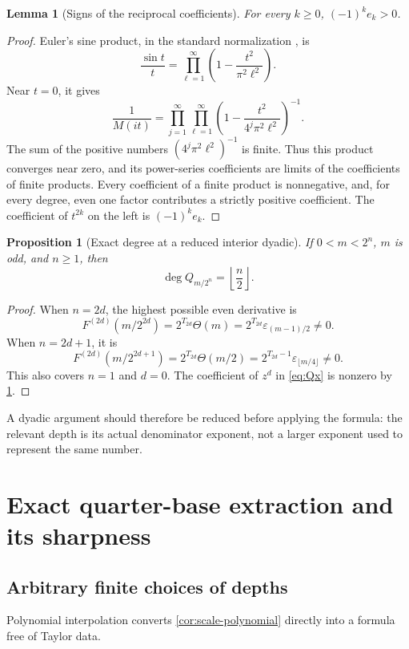 \documentclass[11pt,a4paper]{article}
\numberwithin{equation}{section}
\newtheorem{lemma}[theorem]{Lemma}
\newtheorem{proposition}[theorem]{Proposition}
\theoremstyle{definition}
\theoremstyle{remark}
\newcommand{\eps}{\varepsilon}
\newcommand{\floor}[1]{\left\lfloor #1\right\rfloor}
\begin{document}
\begin{lemma}[Signs of the reciprocal coefficients]
\label{lem:e-sign}
For every $k\ge0$, $(-1)^ke_k>0$.
\end{lemma}
\begin{proof}
Euler's sine product, in the standard normalization \cite[Eq.~4.22.1]{dlmf}, is
\[
 \frac{\sin t}{t}=\prod_{\ell=1}^{\infty}
    \left(1-\frac{t^2}{\pi^2\ell^2}\right).
\]
Near $t=0$, it gives
\begin{equation}
 \frac1{M(it)}=
 \prod_{j=1}^{\infty}\prod_{\ell=1}^{\infty}
 \left(1-\frac{t^2}{4^j\pi^2\ell^2}\right)^{-1}.
 \label{eq:e-positive-product}
\end{equation}
The sum of the positive numbers $(4^j\pi^2\ell^2)^{-1}$ is finite. Thus this product converges near zero, and its power-series coefficients are limits of the coefficients of finite products. Every coefficient of a finite product is nonnegative, and, for every degree, even one factor contributes a strictly positive coefficient. The coefficient of $t^{2k}$ on the left is $(-1)^ke_k$.
\end{proof}

\begin{proposition}[Exact degree at a reduced interior dyadic]
\label{prop:exact-degree}
If $0<m<2^n$, $m$ is odd, and $n\ge1$, then
\begin{equation}
 \deg Q_{m/2^n}=\floor{\frac n2}.
 \label{eq:exact-degree}
\end{equation}
\end{proposition}
\begin{proof}
When $n=2d$, the highest possible even derivative is
\[
 F^{(2d)}(m/2^{2d})=2^{T_{2d}}\Theta(m)
   =2^{T_{2d}}\eps_{(m-1)/2}\ne0.
\]
When $n=2d+1$, it is
\[
 F^{(2d)}(m/2^{2d+1})
 =2^{T_{2d}}\Theta(m/2)
 =2^{T_{2d}-1}\eps_{\lfloor m/4\rfloor}\ne0.
\]
This also covers $n=1$ and $d=0$. The coefficient of $z^d$ in \cref{eq:Qx} is nonzero by \cref{lem:e-sign}.
\end{proof}
A dyadic argument should therefore be reduced before applying the formula: the relevant depth is its actual denominator exponent, not a larger exponent used to represent the same number.

\section{Exact quarter-base extraction and its sharpness}
\label{sec:extraction}

\subsection{Arbitrary finite choices of depths}
Polynomial interpolation converts \cref{cor:scale-polynomial} directly into a formula free of Taylor data.
\end{document}
